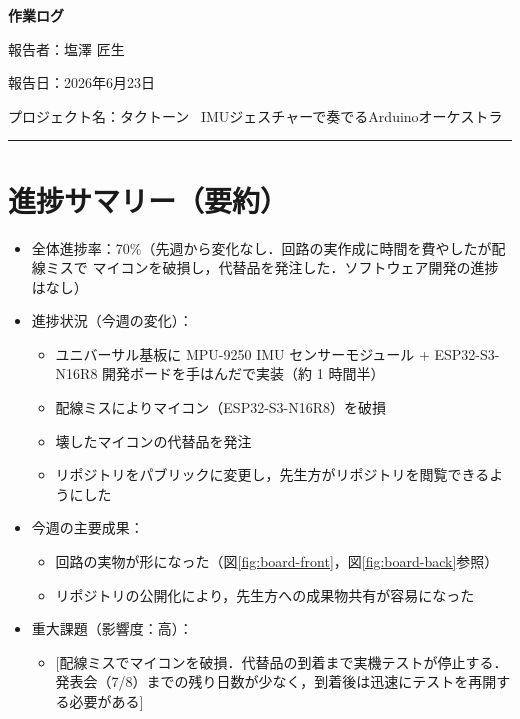 \documentclass[uplatex,dvipdfmx,a4paper,11pt]{jsarticle}
\newcommand{\sectionrule}{\par\medskip\noindent\rule{\linewidth}{0.6pt}\par\medskip}
\begin{document}
{\LARGE\bfseries 作業ログ}\par\bigskip

報告者：塩澤 匠生

報告日：2026年6月23日

プロジェクト名：タクトーン~ IMUジェスチャーで奏でるArduinoオーケストラ~ \\

\sectionrule

\section{進捗サマリー（要約）}

\begin{itemize}
  \item 全体進捗率：70\%（先週から変化なし．回路の実作成に時間を費やしたが配線ミスで
        マイコンを破損し，代替品を発注した．ソフトウェア開発の進捗はなし）
  \item 進捗状況（今週の変化）：
    \begin{itemize}
      \item ユニバーサル基板に MPU-9250 IMU センサーモジュール + ESP32-S3-N16R8 開発ボードを手はんだで実装（約 1 時間半）
      \item 配線ミスによりマイコン（ESP32-S3-N16R8）を破損
      \item 壊したマイコンの代替品を発注
      \item リポジトリをパブリックに変更し，先生方がリポジトリを閲覧できるようにした
    \end{itemize}
  \item 今週の主要成果：
    \begin{itemize}
      \item 回路の実物が形になった（図\ref{fig:board-front}，図\ref{fig:board-back}参照）
      \item リポジトリの公開化により，先生方への成果物共有が容易になった
    \end{itemize}
  \item 重大課題（影響度：高）：
    \begin{itemize}
      \item {}[配線ミスでマイコンを破損．代替品の到着まで実機テストが停止する．
            発表会（7/8）までの残り日数が少なく，到着後は迅速にテストを再開する必要がある]
    \end{itemize}
\end{itemize}
\end{document}
